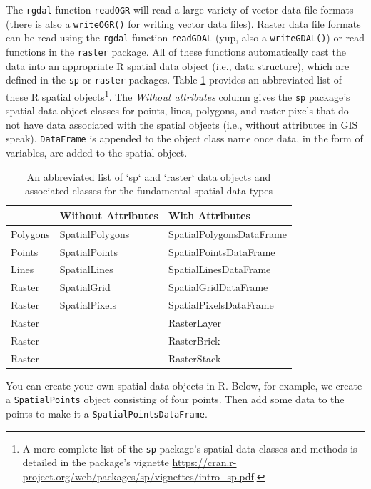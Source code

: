 \documentclass[
]{krantz}
\begin{document}
The \texttt{rgdal} function \texttt{readOGR} will read a large variety of vector data file formats (there is also a \texttt{writeOGR()} for writing vector data files). Raster data file formats can be read using the \texttt{rgdal} function \texttt{readGDAL} (yup, also a \texttt{writeGDAL()}) or read functions in the \texttt{raster} package. All of these functions automatically cast the data into an appropriate R spatial data object (i.e., data structure), which are defined in the \texttt{sp} or \texttt{raster} packages. Table \ref{tab:spatialObjs} provides an abbreviated list of these R spatial objects\footnote{A more complete list of the \texttt{sp} package's spatial data classes and methods is detailed in the package's vignette \url{https://cran.r-project.org/web/packages/sp/vignettes/intro_sp.pdf}.}. The \emph{Without attributes }column gives the \texttt{sp} package's spatial data object classes for points, lines, polygons, and raster pixels that do not have data associated with the spatial objects (i.e., without attributes in GIS speak). \texttt{DataFrame} is appended to the object class name once data, in the form of variables, are added to the spatial object.

\begin{table}

\caption{\label{tab:spatialObjs}An abbreviated list of `sp` and `raster` data objects and associated classes for the fundamental spatial data types}
\centering
\begin{tabular}[t]{lll}
\toprule
 & Without Attributes & With Attributes\\
\midrule
Polygons & SpatialPolygons & SpatialPolygonsDataFrame\\
Points & SpatialPoints & SpatialPointsDataFrame\\
Lines & SpatialLines & SpatialLinesDataFrame\\
Raster & SpatialGrid & SpatialGridDataFrame\\
Raster & SpatialPixels & SpatialPixelsDataFrame\\
\addlinespace
Raster &  & RasterLayer\\
Raster &  & RasterBrick\\
Raster &  & RasterStack\\
\bottomrule
\end{tabular}
\end{table}

You can create your own spatial data objects in R. Below, for example, we create a \texttt{SpatialPoints} object consisting of four points. Then add some data to the points to make it a \texttt{SpatialPointsDataFrame}.
\end{document}
